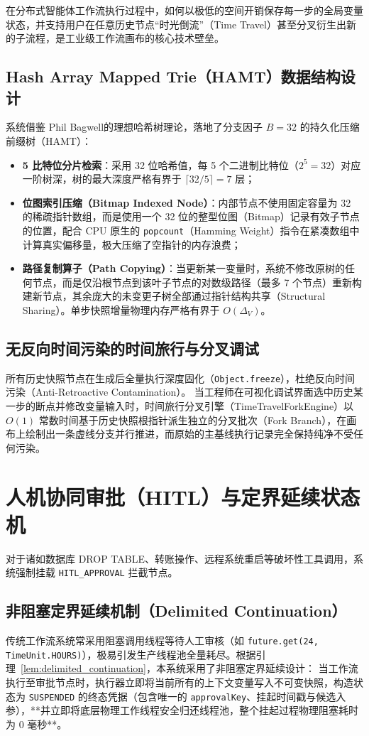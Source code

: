 在分布式智能体工作流执行过程中，如何以极低的空间开销保存每一步的全局变量状态，并支持用户在任意历史节点“时光倒流”（Time Travel）甚至分叉衍生出新的子流程，是工业级工作流画布的核心技术壁垒。

\subsection{Hash Array Mapped Trie（HAMT）数据结构设计}
系统借鉴 Phil Bagwell\cite{Bagwell2001HAMT}的理想哈希树理论，落地了分支因子 $B=32$ 的持久化压缩前缀树（HAMT）：
\begin{itemize}
    \item \textbf{5 比特位分片检索}：采用 32 位哈希值，每 5 个二进制比特位（$2^5 = 32$）对应一阶树深，树的最大深度严格有界于 $\lceil 32 / 5 \rceil = 7$ 层；
    \item \textbf{位图索引压缩（Bitmap Indexed Node）}：内部节点不使用固定容量为 32 的稀疏指针数组，而是使用一个 32 位的整型位图（Bitmap）记录有效子节点的位置，配合 CPU 原生的 \texttt{popcount}（Hamming Weight）指令在紧凑数组中计算真实偏移量，极大压缩了空指针的内存浪费；
    \item \textbf{路径复制算子（Path Copying）}：当更新某一变量时，系统不修改原树的任何节点，而是仅沿根节点到该叶子节点的对数级路径（最多 7 个节点）重新构建新节点，其余庞大的未变更子树全部通过指针结构共享（Structural Sharing）。单步快照增量物理内存严格有界于 $O(\Delta_V)$。
\end{itemize}

\subsection{无反向时间污染的时间旅行与分叉调试}
所有历史快照节点在生成后全量执行深度固化（\texttt{Object.freeze}），杜绝反向时间污染（Anti-Retroactive Contamination）。
当工程师在可视化调试界面选中历史某一步的断点并修改变量输入时，时间旅行分叉引擎（TimeTravelForkEngine）以 $O(1)$ 常数时间基于历史快照根指针派生独立的分叉批次（Fork Branch），在画布上绘制出一条虚线分支并行推进，而原始的主基线执行记录完全保持纯净不受任何污染。

\section{人机协同审批（HITL）与定界延续状态机}

对于诸如数据库 DROP TABLE、转账操作、远程系统重启等破坏性工具调用，系统强制挂载 \texttt{HITL\_APPROVAL} 拦截节点。

\subsection{非阻塞定界延续机制（Delimited Continuation）}
传统工作流系统常采用阻塞调用线程等待人工审核（如 \texttt{future.get(24, TimeUnit.HOURS)}），极易引发生产线程池全量耗尽。根据引理~\ref{lem:delimited_continuation}，本系统采用了非阻塞定界延续设计：
当工作流执行至审批节点时，执行器立即将当前所有的上下文变量写入不可变快照，构造状态为 \texttt{SUSPENDED} 的终态凭据（包含唯一的 \texttt{approvalKey}、挂起时间戳与候选入参），**并立即将底层物理工作线程安全归还线程池，整个挂起过程物理阻塞耗时为 0 毫秒**。

